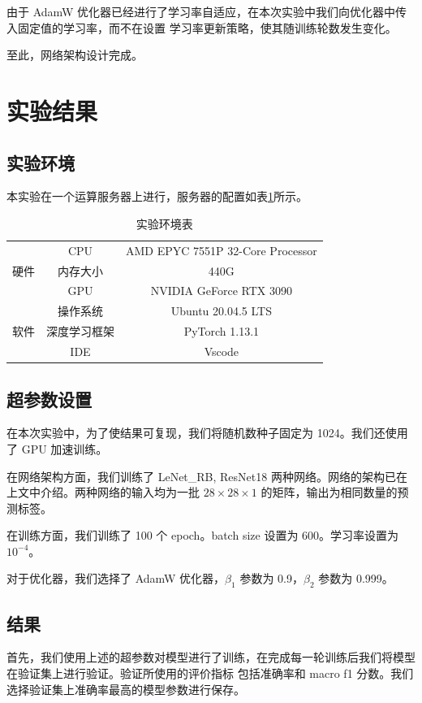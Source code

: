 \documentclass[supercite]{Experimental_Report}
\theoremstyle{definition}
\begin{document}
由于 AdamW 优化器已经进行了学习率自适应，在本次实验中我们向优化器中传入固定值的学习率，而不在设置
学习率更新策略，使其随训练轮数发生变化。

至此，网络架构设计完成。


\section{实验结果}
\subsection{实验环境}
本实验在一个运算服务器上进行，服务器的配置如表\ref{服务器配置}所示。
\begin{table}[H]
	\centering
	\caption{实验环境表}
	  \begin{tabular}{c|c|c}
		\toprule
	  \multirow{3}[0]{*}{硬件} & CPU   & AMD EPYC 7551P 32-Core Processor \\
			& 内存大小    & 440G \\
			& GPU   & NVIDIA GeForce RTX 3090 \\\hline
	  \multirow{3}[0]{*}{软件} & 操作系统  & Ubuntu 20.04.5 LTS \\
			& 深度学习框架 & PyTorch 1.13.1 \\
			& IDE   & Vscode \\\bottomrule
	  \end{tabular}
	\label{服务器配置}
\end{table}
\subsection{超参数设置}
在本次实验中，为了使结果可复现，我们将随机数种子固定为 1024。我们还使用了 GPU 加速训练。

在网络架构方面，我们训练了 LeNet\_RB, ResNet18 两种网络。网络的架构已在上文中介绍。两种网络的输入均为一批 $28\times 28\times 1$
的矩阵，输出为相同数量的预测标签。

在训练方面，我们训练了 100 个 epoch。batch size 设置为 600。学习率设置为 $10^{-4}$。

对于优化器，我们选择了 AdamW 优化器，$\beta_1$ 参数为 0.9，$\beta_2$ 参数为 0.999。

\subsection{结果}
首先，我们使用上述的超参数对模型进行了训练，在完成每一轮训练后我们将模型在验证集上进行验证。验证所使用的评价指标
包括准确率和 macro f1 分数。我们选择验证集上准确率最高的模型参数进行保存。
\end{document}
